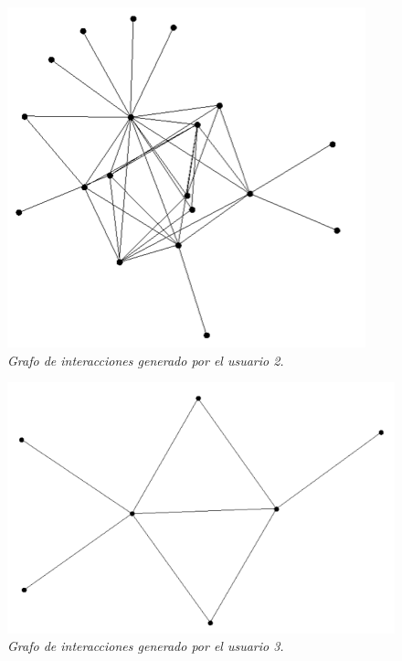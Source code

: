 \begin{figure}
  \centering
  \includegraphics[scale=.7]{images/Figura5-3}
  \caption{\em Grafo de interacciones generado por el usuario 2.}
  \label{fig:exp-im3}
\end{figure}

\begin{figure}
  \centering
  \includegraphics[scale=.7]{images/Figura5-4}
  \caption{\em Grafo de interacciones generado por el usuario 3.}
  \label{fig:exp-im4}
\end{figure}

